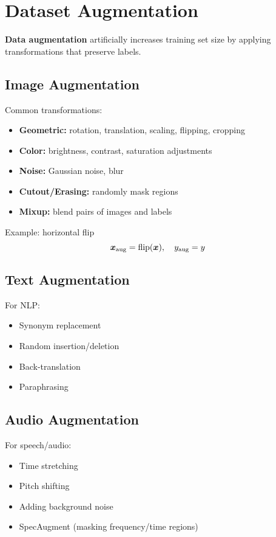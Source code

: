 
\section{Dataset Augmentation}
\label{sec:data-augmentation}

\textbf{Data augmentation} artificially increases training set size by applying transformations that preserve labels.

\subsection{Image Augmentation}

Common transformations:
\begin{itemize}
    \item \textbf{Geometric:} rotation, translation, scaling, flipping, cropping
    \item \textbf{Color:} brightness, contrast, saturation adjustments
    \item \textbf{Noise:} Gaussian noise, blur
    \item \textbf{Cutout/Erasing:} randomly mask regions
    \item \textbf{Mixup:} blend pairs of images and labels
\end{itemize}

Example: horizontal flip
\begin{equation}
\boldsymbol{x}_{\text{aug}} = \text{flip}(\boldsymbol{x}), \quad y_{\text{aug}} = y
\end{equation}

\subsection{Text Augmentation}

For NLP:
\begin{itemize}
    \item Synonym replacement
    \item Random insertion/deletion
    \item Back-translation
    \item Paraphrasing
\end{itemize}

\subsection{Audio Augmentation}

For speech/audio:
\begin{itemize}
    \item Time stretching
    \item Pitch shifting
    \item Adding background noise
    \item SpecAugment (masking frequency/time regions)
\end{itemize}

